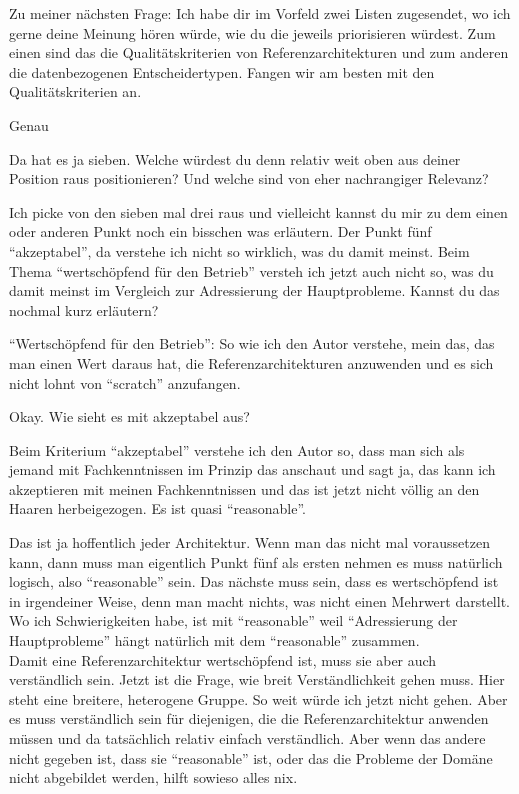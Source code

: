 \LF	 Zu meiner nächsten Frage: Ich habe dir im Vorfeld zwei Listen zugesendet, wo ich gerne deine Meinung hören würde, wie du die jeweils priorisieren würdest. Zum einen sind das die Qualitätskriterien von Referenzarchitekturen und zum anderen die datenbezogenen Entscheidertypen. Fangen wir am besten mit den Qualitätskriterien an.

\PA	 Genau

\LF	Da hat es ja sieben. Welche würdest du denn relativ weit oben aus deiner Position raus positionieren? Und welche sind von eher nachrangiger Relevanz?

\PA	Ich picke von den sieben mal drei raus und vielleicht kannst du mir zu dem einen oder anderen Punkt noch ein bisschen was erläutern. Der Punkt fünf \enquote{akzeptabel}, da verstehe ich nicht so wirklich, was du damit meinst. Beim  Thema \enquote{wertschöpfend für den Betrieb} versteh ich jetzt auch nicht so, was du damit meinst im Vergleich zur Adressierung der Hauptprobleme. Kannst du das nochmal kurz erläutern?

\LF	\enquote{Wertschöpfend für den Betrieb}: So wie ich den Autor verstehe, mein das, das man einen Wert daraus hat, die Referenzarchitekturen anzuwenden und es sich nicht lohnt von \enquote{scratch} anzufangen.

\PA	 Okay. Wie sieht es mit akzeptabel aus?

\LF	Beim Kriterium \enquote{akzeptabel} verstehe ich den Autor so, dass man sich als jemand mit Fachkenntnissen im Prinzip das anschaut und sagt ja, das kann ich akzeptieren mit meinen Fachkenntnissen und das ist jetzt nicht völlig an den Haaren herbeigezogen. Es ist quasi \enquote{reasonable}.

\PA	Das ist ja hoffentlich jeder Architektur. Wenn man das nicht mal voraussetzen kann, dann muss man eigentlich Punkt fünf als ersten nehmen es muss natürlich logisch, also \enquote{reasonable} sein. Das nächste muss sein, dass es wertschöpfend ist in irgendeiner Weise, denn man macht nichts, was nicht einen Mehrwert darstellt. Wo ich Schwierigkeiten habe, ist mit \enquote{reasonable}  weil \enquote{Adressierung der Hauptprobleme} hängt natürlich mit dem \enquote{reasonable} zusammen.\\
Damit eine Referenzarchitektur wertschöpfend ist, muss sie aber auch verständlich sein. Jetzt ist die Frage, wie breit Verständlichkeit gehen muss. Hier steht eine breitere, heterogene Gruppe. So weit würde ich jetzt nicht gehen. Aber es muss verständlich sein für diejenigen, die die Referenzarchitektur anwenden müssen und da tatsächlich relativ einfach verständlich. Aber wenn das andere nicht gegeben ist, dass sie \enquote{reasonable} ist, oder das die Probleme der Domäne nicht abgebildet werden, hilft sowieso alles nix.

